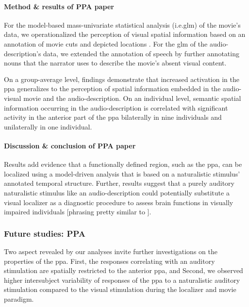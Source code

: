 \paragraph{Method \& results of PPA paper}
For the model-based mass-univariate statistical analysis (i.e.\ac{glm}) of the
movie's data, we operationalized the perception of visual spatial information
based on an annotation of movie cuts and depicted locations
\citep{haeusler2016cutanno}.
For the \ac{glm} of the audio-description's data, we extended the annotation of
speech \citep{haeusler2021speechanno} by further annotating nouns that the
narrator uses to describe the movie's absent visual content.

On a group-average level, findings demonstrate that increased activation in the
\ac{ppa} generalizes to the perception of spatial information embedded in the
audio-visual movie and the audio-description.
On an individual level, semantic spatial information occurring in the
audio-description is correlated with significant activity in the anterior part
of the \ac{ppa} bilaterally in nine individuals and unilaterally in one
individual.


\paragraph{Discussion \& conclusion of PPA paper}

Results add evidence \citep[cf.][]{bartels2004mapping} that a functionally
defined region, such as the \ac{ppa}, can be localized using a model-driven
analysis that is based on a naturalistic stimulus' annotated temporal structure.
Further, results suggest that a purely auditory naturalistic stimulus like an
audio-description could potentially substitute a visual localizer as a
diagnostic procedure to assess brain functions in visually impaired individuals
[phrasing pretty similar to \citep{haeusler2022processing}].


\subsubsection{Future studies: PPA}


%
Two aspect revealed by our analyses invite further investigations on the
properties of the \ac{ppa}.
%
First, the responses correlating with an auditory stimulation are spatially
restricted to the anterior \ac{ppa}, and
%
Second, we observed higher intersubject variability of responses of the \ac{ppa}
to a naturalistic auditory stimulation compared to the visual stimulation during
the localizer and movie paradigm.


